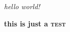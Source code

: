 \documentclass{article}
\begin{document}
\textit{hello world!}



\textbf{this is just a \textsc{test}}
\end{document}
